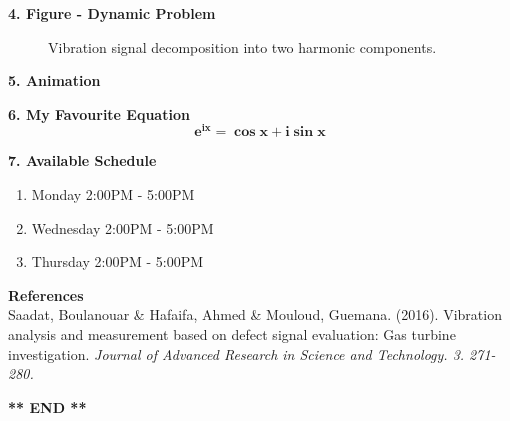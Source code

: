 \documentclass[12pt,a4paper]{article}
\begin{document}
\newpage

\textbf{4. Figure - Dynamic Problem}
\begin{figure} [h]
  \begin{center}
    \caption{Vibration signal decomposition into two harmonic components.}
    \label{image}
  \end{center}
\end{figure}
\bigskip

\textbf{5. Animation}

\bigskip

\textbf{6. My Favourite Equation}
\begin{equation}
  \mathbf{e}^\mathbf{ix} = \mathbf{\cos{x}} + \mathbf{i \sin{x}}
\end{equation}
\bigskip

\textbf{7. Available Schedule}
\begin{enumerate}
  \item Monday 2:00PM - 5:00PM
  \item Wednesday 2:00PM - 5:00PM
  \item Thursday 2:00PM - 5:00PM
\end{enumerate}
\bigskip

\noindent \textbf{References}\\
\noindent [\ref{image}] Saadat, Boulanouar \& Hafaifa, Ahmed \& Mouloud, Guemana. (2016).
Vibration analysis and measurement based on defect signal evaluation: Gas turbine investigation.
\textit{Journal of Advanced Research in Science and Technology. 3. 271-280.}
\bigskip

\begin{center}
  \textbf{** END **}
\end{center}
\end{document}
